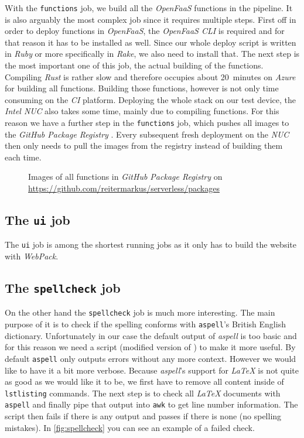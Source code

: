 With the \texttt{functions} job, we build all the \textit{OpenFaaS} functions in the pipeline. It is
also arguably the most complex job since it requires multiple steps. First off in order to deploy
functions in \textit{OpenFaaS}, the \textit{OpenFaaS CLI} \cite{faas-cli} is required and for that
reason it has to be installed as well. Since our whole deploy script is written in \textit{Ruby} or
more specifically in \textit{Rake}, we also need to install that. The next step is the most important
one of this job, the actual building of the functions. Compiling \textit{Rust} is rather slow and
therefore occupies about 20~minutes on \textit{Azure} for building all functions. Building those
functions, however is not only time consuming on the \textit{CI} platform. Deploying the whole stack
on our test device, the \textit{Intel NUC} also takes some time, mainly due to compiling functions.
For this reason we have a further step in the \texttt{functions} job, which pushes all images to the
\textit{GitHub Package Registry} \cite{github-registry}. Every subsequent fresh deployment on the
\textit{NUC} then only needs to pull the images from the registry instead of building them each time.

\begin{figure}[H]
  \centering
  \caption{Images of all functions in \textit{GitHub Package Registry} on \\
    \url{https://github.com/reitermarkus/serverless/packages}}
\end{figure}

\subsection{The \texttt{ui} job}

The \texttt{ui} job is among the shortest running jobs as it only has to build the website with
\textit{WebPack}.

\subsection{The \texttt{spellcheck} job}

On the other hand the \texttt{spellcheck} job is much more interesting. The main purpose of it is
to check if the spelling conforms with \texttt{aspell}'s British English dictionary. Unfortunately
in our case the default output of \textit{aspell} is too basic and for this reason we need a script
(modified version of \cite{aspell-awk}) to make it more useful. By default \texttt{aspell} only
outputs errors without any more context. However we would like to have it a bit more verbose.
Because \textit{aspell}'s support for \textit{LaTeX} is not quite as good as we would like it to be,
we first have to remove all content inside of \texttt{lstlisting} commands. The next step is to
check all \textit{LaTeX} documents with \texttt{aspell} and finally pipe that output into
\texttt{awk} to get line number information. The script then fails if there is any output
and passes if there is none (no spelling mistakes). In \autoref{fig:spellcheck} you can see an
example of a failed check.

